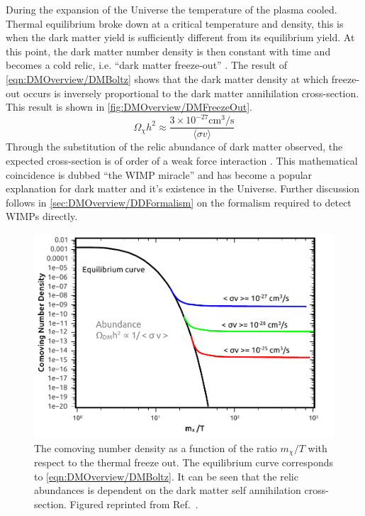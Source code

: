During the expansion of the Universe the temperature of the plasma cooled. Thermal equilibrium broke down at a critical temperature and density, this is when the dark matter yield is sufficiently different from its equilibrium yield. At this point, the dark matter number density is then constant with time and becomes a cold relic, i.e. ``dark matter freeze-out'' \cite{DMPrimer}. The result of \autoref{eqn:DMOverview/DMBoltz} shows that the dark matter density at which freeze-out occurs is inversely proportional to the dark matter annihilation cross-section. This result is shown in \autoref{fig:DMOverview/DMFreezeOut}. 
\begin{equation}
    \Omega_\chi h^2\approx\frac{3\times10^{-27}\text{cm}^3/\text{s}}{\langle\sigma v\rangle}
\end{equation}
Through the substitution of the relic abundance of dark matter observed, the expected cross-section is of order of a weak force interaction \cite{Arcadi:2017kky}. This mathematical coincidence is dubbed ``the WIMP miracle'' and has become a popular explanation for dark matter and it's existence in the Universe. Further discussion follows in \autoref{sec:DMOverview/DDFormalism} on the formalism required to detect WIMPs directly. %
\begin{figure}[h!]
    \centering
    \includegraphics[width=0.7\linewidth]{figures/DMOverview/abundanceplot.pdf}
    \caption[The comoving number density as a function of the ratio $m_\chi/T$ with respect to the thermal freeze out.]{The comoving number density as a function of the ratio $m_\chi/T$ with respect to the thermal freeze out. The equilibrium curve corresponds to \autoref{eqn:DMOverview/DMBoltz}. It can be seen that the relic abundances is dependent on the dark matter self annihilation cross-section. Figured reprinted from Ref.~\cite{Arcadi:2017kky}.}
    \label{fig:DMOverview/DMFreezeOut}
\end{figure}
